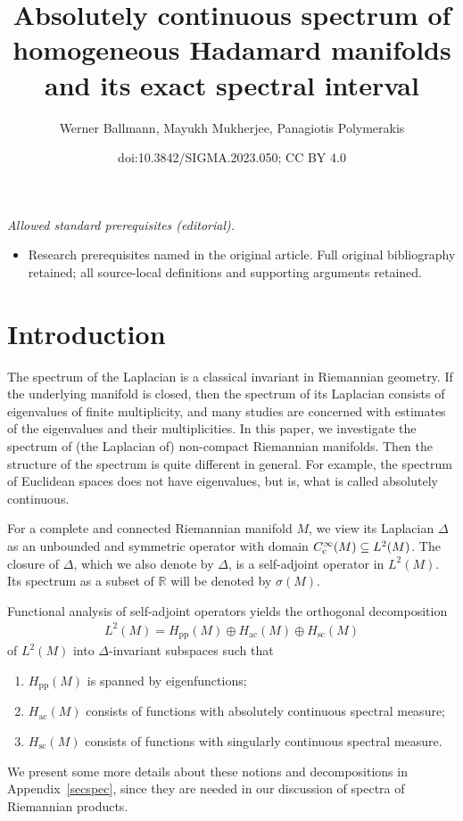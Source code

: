\documentclass[10pt,a4paper]{amsart}
\title{Absolutely continuous spectrum of homogeneous Hadamard manifolds and its exact spectral interval}
\author{Werner Ballmann, Mayukh Mukherjee, Panagiotis Polymerakis}
\date{doi:10.3842/SIGMA.2023.050; CC BY 4.0}
\numberwithin{equation}{section}
\def\p{\mathrm{pp}}
\def\ac{\mathrm{ac}}
\def\sc{\mathrm{sc}}
\def\R{\mathbb R}
\begin{document}
\maketitle
\noindent\textit{Allowed standard prerequisites (editorial).}\begin{itemize}
\item Research prerequisites named in the original article. Full original bibliography retained; all source-local definitions and supporting arguments retained.
\end{itemize}\medskip
\section{Introduction}

The spectrum of the Laplacian is a classical invariant in Riemannian geometry.
If the underlying manifold is closed,
then the spectrum of its Laplacian consists of eigenvalues of finite multiplicity,
and many studies are concerned with estimates of the eigenvalues and their multiplicities.
In this paper, we investigate the spectrum of (the Laplacian of) non-compact Riemannian manifolds.
Then the structure of the spectrum is quite different in general.
For example, the spectrum of Euclidean spaces does not have eigenvalues,
but is, what is called absolutely continuous.

For a complete and connected Riemannian manifold $M$, we view its Laplacian $\Delta$
as an unbounded and symmetric operator with domain $C^\infty_{\rm c}(M) \subseteq L^2(M)$.
The closure of $\Delta$, which we also denote by $\Delta$, is a self-adjoint operator in $L^2(M)$.
Its spectrum as a subset of $\R$ will be denoted by $\sigma(M)$.

Functional analysis of self-adjoint operators yields the orthogonal decomposition
\begin{align*}%
L^2(M) = H_{\p}(M) \oplus H_{\ac}(M) \oplus H_{\sc}(M)
\end{align*}
of $L^2(M)$ into $\Delta$-invariant subspaces such that
\begin{enumerate}\itemsep=0pt
\item[(1)] $H_{\p}(M)$ is spanned by eigenfunctions;
\item[(2)] $H_{\ac}(M)$ consists of functions with absolutely continuous spectral measure;
\item[(3)] $H_{\sc}(M)$ consists of functions with singularly continuous spectral measure.
\end{enumerate}
We present some more details about these notions and decompositions in Appendix~\ref{secspec},
since they are needed in our discussion of spectra of Riemannian products.
\end{document}
